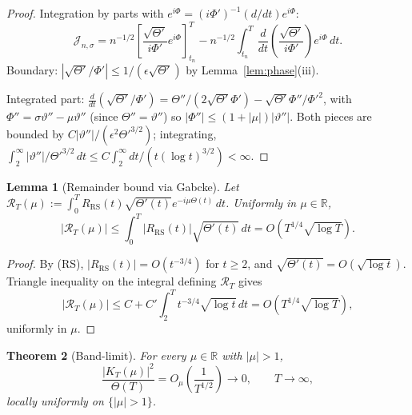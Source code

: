 \documentclass[11pt]{article}
\newtheorem{theorem}{Theorem}
\newtheorem{lemma}[theorem]{Lemma}
\theoremstyle{definition}
\newcommand{\R}{\mathbb{R}}
\begin{document}
\begin{proof}
Integration by parts with $e^{i\Phi} = (i\Phi')^{-1}(d/dt)e^{i\Phi}$:
\[
\mathcal J_{n,\sigma} = n^{-1/2}\left[\frac{\sqrt{\Theta'}}{i\Phi'}e^{i\Phi}\right]_{t_n}^T - n^{-1/2}\int_{t_n}^T \frac{d}{dt}\!\left(\frac{\sqrt{\Theta'}}{i\Phi'}\right)e^{i\Phi}\,dt.
\]
Boundary: $|\sqrt{\Theta'}/\Phi'| \leq 1/(\epsilon\sqrt{\Theta'})$ by Lemma~\ref{lem:phase}(iii).

Integrated part: $\frac{d}{dt}(\sqrt{\Theta'}/\Phi') = \Theta''/(2\sqrt{\Theta'}\Phi') - \sqrt{\Theta'}\Phi''/\Phi'^2$, with $\Phi'' = \sigma\vartheta'' - \mu\vartheta''$ (since $\Theta'' = \vartheta''$) so $|\Phi''| \leq (1+|\mu|)|\vartheta''|$. Both pieces are bounded by $C|\vartheta''|/(\epsilon^2\Theta'^{3/2})$; integrating, $\int_2^\infty |\vartheta''|/\Theta'^{3/2}\,dt \leq C\int_2^\infty dt/(t(\log t)^{3/2}) < \infty$.
\end{proof}

\begin{lemma}[Remainder bound via Gabcke]\label{lem:remainder}
Let $\mathcal R_T(\mu) := \int_0^T R_{\mathrm{RS}}(t)\sqrt{\Theta'(t)}e^{-i\mu\Theta(t)}\,dt$. Uniformly in $\mu \in \R$,
\[
|\mathcal R_T(\mu)| \leq \int_0^T |R_{\mathrm{RS}}(t)|\sqrt{\Theta'(t)}\,dt = O(T^{1/4}\sqrt{\log T}).
\]
\end{lemma}

\begin{proof}
By (RS), $|R_{\mathrm{RS}}(t)| = O(t^{-3/4})$ for $t \geq 2$, and $\sqrt{\Theta'(t)} = O(\sqrt{\log t})$. Triangle inequality on the integral defining $\mathcal R_T$ gives
\[
|\mathcal R_T(\mu)| \leq C + C'\int_2^T t^{-3/4}\sqrt{\log t}\,dt = O(T^{1/4}\sqrt{\log T}),
\]
uniformly in $\mu$.
\end{proof}

\begin{theorem}[Band-limit]\label{thm:bandlimit}
For every $\mu \in \R$ with $|\mu| > 1$,
\[
\frac{|K_T(\mu)|^2}{\Theta(T)} = O_\mu\!\left(\frac{1}{T^{1/2}}\right) \longrightarrow 0,\qquad T \to \infty,
\]
locally uniformly on $\{|\mu| > 1\}$.
\end{theorem}
\end{document}

